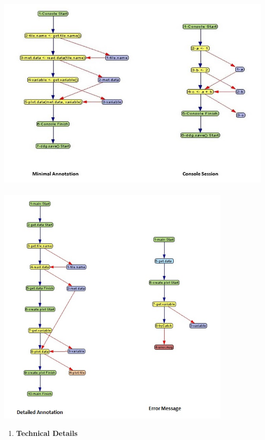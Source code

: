 \documentclass[letterpaper]{article}
\newcounter{saveenum}
\newcommand\liststyleWWNumxv{%
\renewcommand\theenumi{\arabic{enumi}}
\renewcommand\theenumii{\alph{enumii}}
\renewcommand\theenumiii{\alph{enumii}.\roman{enumiii}}
\renewcommand\theenumiv{\alph{enumii}.\roman{enumiii}.\arabic{enumiv}}
\renewcommand\labelenumi{\theenumi.}
\renewcommand\labelenumii{\theenumii.}
\renewcommand\labelenumiii{\theenumiii.}
\renewcommand\labelenumiv{\theenumiv.}
}
\begin{document}
\bigskip

{\centering  \includegraphics[width=5.4in,height=3.7547in]{UsingRDataTracker-img/UsingRDataTracker-img003.jpg} \par}

\bigskip

{\centering  \includegraphics[width=4.4252in,height=4.5744in]{UsingRDataTracker-img/UsingRDataTracker-img004.jpg} \par}
\liststyleWWNumxv
\setcounter{saveenum}{\value{enumi}}
\begin{enumerate}
\setcounter{enumi}{\value{saveenum}}
\item \textbf{Technical Details}
\end{enumerate}
\end{document}

